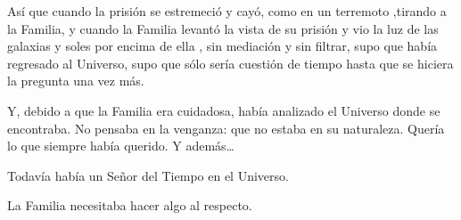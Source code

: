 Así que cuando la prisión se estremeció y cayó, como en un terremoto ,tirando a la Familia, y cuando la Familia levantó la vista de su prisión y vio la luz de las galaxias y soles por encima de ella , sin mediación y sin filtrar, supo que había regresado al Universo, supo que sólo sería cuestión de tiempo hasta que se hiciera la pregunta una vez más.

Y, debido a que la Familia era cuidadosa, había analizado el Universo donde se encontraba. No pensaba en la venganza: que no estaba en su naturaleza. Quería lo que siempre había querido. Y además\ldots{}

Todavía había un Señor del Tiempo en el Universo.

La Familia necesitaba hacer algo al respecto.

